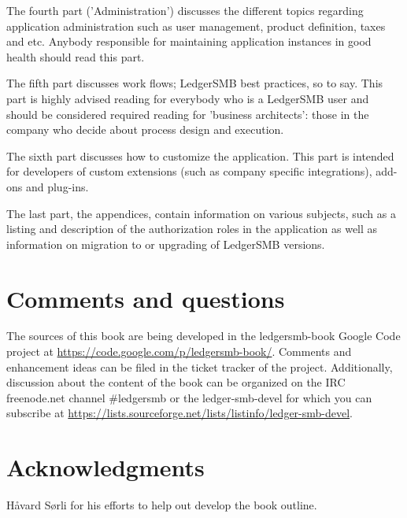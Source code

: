 \documentclass[10pt,a4paper]{book}
\begin{document}
The fourth part ('Administration') discusses the different topics
regarding application administration such as user management, product definition, taxes and etc.
Anybody responsible for maintaining application instances in good health should read this part.

The fifth part discusses work flows; LedgerSMB best practices, so to say. This part is highly advised
reading for everybody who is a LedgerSMB user and should be considered required reading for 'business
architects': those in the company who decide about process design and execution.

The sixth part discusses how to customize the application. This part is intended for developers of
custom extensions (such as company specific integrations), add-ons and plug-ins.

The last part, the appendices, contain information on various subjects, such as a listing and description
of the authorization roles in the application as well as information on migration to or upgrading of
LedgerSMB versions.


\section*{Comments and questions}
\label{sec-comments}

The sources of this book are being developed in the ledgersmb-book Google Code project at
\url{https://code.google.com/p/ledgersmb-book/}. Comments and enhancement ideas can be filed
in the ticket tracker of the project. Additionally, discussion about the content of the book
can be organized on the IRC freenode.net channel \#ledgersmb or the ledger-smb-devel for which
you can subscribe at \url{https://lists.sourceforge.net/lists/listinfo/ledger-smb-devel}.



\section*{Acknowledgments}
\label{sec-acknowledgements}

H{\aa}vard S{\o}rli for his efforts to help out develop the book outline.








\end{document}
